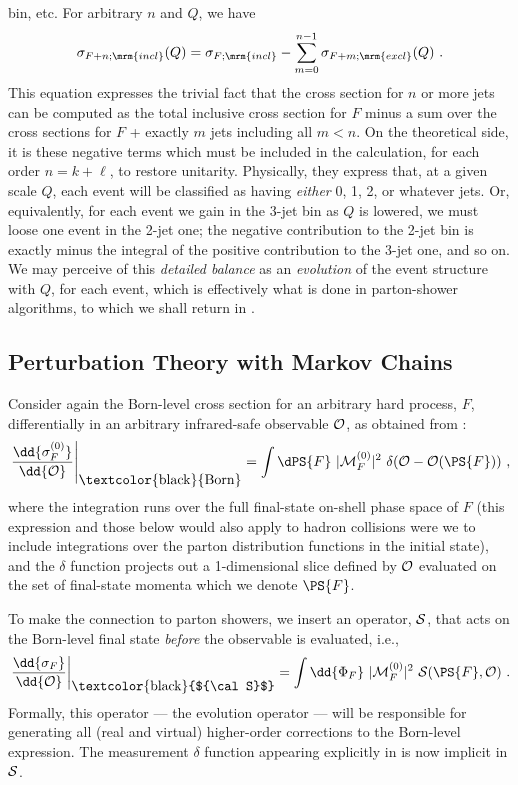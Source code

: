 bin, etc. For arbitrary $n$ and $Q$, we have
\begin{equation}
\sigma_{F+n;\mrm{incl}}(Q) = \sigma_{F;\mrm{incl}}
- \sum_{m=0}^{n-1} \sigma_{F+m;\mrm{excl}}(Q)~. 
\end{equation}
This equation expresses the trivial fact that the cross section for
$n$ or more jets can be computed as the total inclusive cross section for $F$
minus a sum over the cross sections for $F$ + exactly $m$ jets including
all $m<n$. On the theoretical side, it is these negative terms which must
be included in the calculation, for each order $n=k+\ell$, to restore
unitarity. Physically, they 
express that, at a given scale $Q$, each event will be classified
as having \emph{either} 0, 1, 2, or whatever jets. Or, equivalently,
for each event we gain in the 3-jet bin as $Q$ is lowered, we must loose one
event in the 2-jet one; the negative contribution to the 2-jet bin
is exactly minus the integral of the positive contribution to the
3-jet one, and so on. 
We may perceive of this \emph{detailed balance}
 as an \emph{evolution} of the event structure with $Q$, for each 
event, which is effectively what is done in parton-shower
algorithms, to which we shall return in .

\subsection{Perturbation Theory with Markov Chains \label{sec:Markov}}
Consider again the Born-level cross section for an arbitrary hard process,
$F$, differentially in an arbitrary infrared-safe observable $\cal O$,
as obtained from :
\begin{equation}
\left.   \frac{\dd{\sigma^{(0)}_F}}{\dd{\cal O}}\right\vert_{\mbox{\textcolor{black}{Born}}}
 = \int \dPS{F} \ |{\cal M}_F^{(0)}|^2 \ \delta({\cal
   O}-{\cal O}(\PS{F}))~,
\label{eq:starting}
\end{equation}
where the integration runs over the full final-state on-shell phase space of
$F$ (this expression and those below would also apply to hadron collisions
were we to include integrations over the parton distribution functions
in the initial state), and the $\delta$ function projects out a
1-dimensional slice defined by $\cal O$ evaluated on the 
set of final-state momenta which we denote $\PS{F}$.
 
To make the connection to parton showers, 
we insert an operator, ${\cal S}$, that acts on the Born-level
final state \emph{before} the observable is evaluated, i.e., 
\begin{equation}
\left.   \frac{\dd{\sigma_F}}{\dd{\cal
    O}}\right\vert_{\mbox{\textcolor{black}{${\cal S}$}}}
 = \int \dd{\Phi_F} \ |{\cal M}_F^{(0)}|^2 \ {\cal S}(\PS{F},{\cal O})~.
\end{equation}
Formally, this operator --- the evolution operator --- will be
responsible for generating all (real and virtual) 
higher-order corrections to the Born-level expression.
The measurement $\delta$ function appearing explicitly in
 is now implicit in ${\cal S}$.

